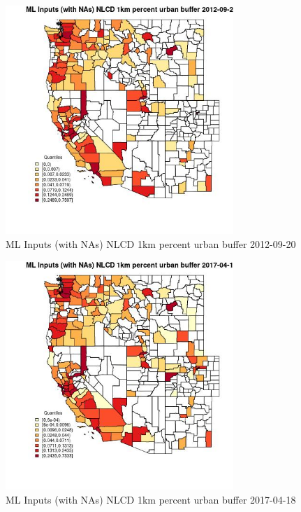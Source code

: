 \begin{figure} 
\centering  
\includegraphics[width=0.77\textwidth]{Code_Outputs/Report_ML_input_PM25_Step4_part_e_de_duplicated_aves_compiled_2019-05-14wNAs_CountyNLCD_1km_percent_urban_bufferMean2012-09-20_2012-09-20.jpg} 
\caption{\label{fig:Report_ML_input_PM25_Step4_part_e_de_duplicated_aves_compiled_2019-05-14wNAsCountyNLCD_1km_percent_urban_bufferMean2012-09-20_2012-09-20}ML Inputs (with NAs) NLCD 1km percent urban buffer 2012-09-20} 
\end{figure} 
 

\begin{figure} 
\centering  
\includegraphics[width=0.77\textwidth]{Code_Outputs/Report_ML_input_PM25_Step4_part_e_de_duplicated_aves_compiled_2019-05-14wNAs_CountyNLCD_1km_percent_urban_bufferMean2017-04-18_2017-04-18.jpg} 
\caption{\label{fig:Report_ML_input_PM25_Step4_part_e_de_duplicated_aves_compiled_2019-05-14wNAsCountyNLCD_1km_percent_urban_bufferMean2017-04-18_2017-04-18}ML Inputs (with NAs) NLCD 1km percent urban buffer 2017-04-18} 
\end{figure} 
 

